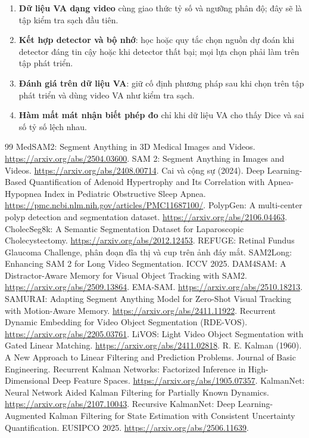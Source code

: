 \documentclass[a4paper,12pt]{report}
\begin{document}
\begin{enumerate}
    \item \textbf{Dữ liệu VA dạng video} cùng giao thức tỷ số và ngưỡng phân độ; đây sẽ là tập kiểm tra sạch đầu tiên.
    \item \textbf{Kết hợp detector và bộ nhớ}: học hoặc quy tắc chọn nguồn dự đoán khi detector đáng tin cậy hoặc khi detector thất bại; mọi lựa chọn phải làm trên tập phát triển.
    \item \textbf{Đánh giá trên dữ liệu VA}: giữ cố định phương pháp sau khi chọn trên tập phát triển và dùng video VA như kiểm tra sạch.
    \item \textbf{Hàm mất mát nhận biết phép đo} chỉ khi dữ liệu VA cho thấy Dice và sai số tỷ số lệch nhau.
\end{enumerate}

\newpage
{}
\begin{thebibliography}{99}
 MedSAM2: Segment Anything in 3D Medical Images and Videos. \url{https://arxiv.org/abs/2504.03600}.
 SAM 2: Segment Anything in Images and Videos. \url{https://arxiv.org/abs/2408.00714}.
 Cai và cộng sự (2024). Deep Learning-Based Quantification of Adenoid Hypertrophy and Its Correlation with Apnea-Hypopnea Index in Pediatric Obstructive Sleep Apnea. \url{https://pmc.ncbi.nlm.nih.gov/articles/PMC11687100/}.
 PolypGen: A multi-center polyp detection and segmentation dataset. \url{https://arxiv.org/abs/2106.04463}.
 CholecSeg8k: A Semantic Segmentation Dataset for Laparoscopic Cholecystectomy. \url{https://arxiv.org/abs/2012.12453}.
 REFUGE: Retinal Fundus Glaucoma Challenge, phân đoạn đĩa thị và cup trên ảnh đáy mắt.
 SAM2Long: Enhancing SAM 2 for Long Video Segmentation. ICCV 2025.
 DAM4SAM: A Distractor-Aware Memory for Visual Object Tracking with SAM2. \url{https://arxiv.org/abs/2509.13864}.
 EMA-SAM. \url{https://arxiv.org/abs/2510.18213}.
 SAMURAI: Adapting Segment Anything Model for Zero-Shot Visual Tracking with Motion-Aware Memory. \url{https://arxiv.org/abs/2411.11922}.
 Recurrent Dynamic Embedding for Video Object Segmentation (RDE-VOS). \url{https://arxiv.org/abs/2205.03761}.
 LiVOS: Light Video Object Segmentation with Gated Linear Matching. \url{https://arxiv.org/abs/2411.02818}.
 R. E. Kalman (1960). A New Approach to Linear Filtering and Prediction Problems. Journal of Basic Engineering.
 Recurrent Kalman Networks: Factorized Inference in High-Dimensional Deep Feature Spaces. \url{https://arxiv.org/abs/1905.07357}.
 KalmanNet: Neural Network Aided Kalman Filtering for Partially Known Dynamics. \url{https://arxiv.org/abs/2107.10043}.
 Recursive KalmanNet: Deep Learning-Augmented Kalman Filtering for State Estimation with Consistent Uncertainty Quantification. EUSIPCO 2025. \url{https://arxiv.org/abs/2506.11639}.
\end{thebibliography}
\end{document}
